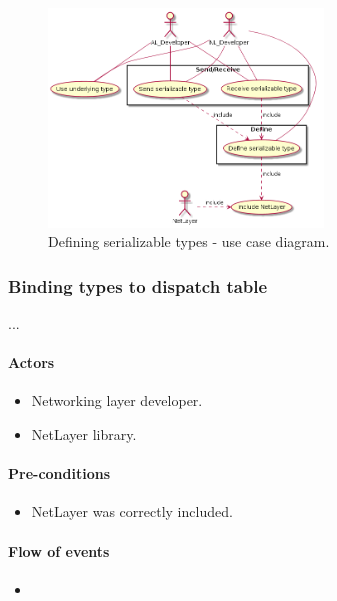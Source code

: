 \documentclass[12pt]{report}
\begin{document}
                    \begin{figure}[H]
                    \caption{Defining serializable types - use case diagram.}
                    \centering
                    \includegraphics[width=0.65\textwidth]{d/uc/def_serializable_t.png}
                    \end{figure}


                \subsubsection{Binding types to dispatch table}
                    ...
                    \paragraph{Actors}
                        \begin{itemize}
                            \item Networking layer developer.
                            \item NetLayer library.
                        \end{itemize}

                    \paragraph{Pre-conditions}
                        \begin{itemize}
                            \item NetLayer was correctly included.
                        \end{itemize}

                    \paragraph{Flow of events}
                        \begin{itemize}
                            \item
                        \end{itemize}
\end{document}
